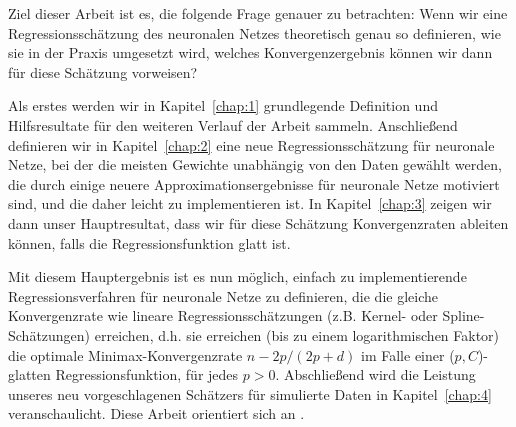 Ziel dieser Arbeit ist es, die folgende Frage genauer zu betrachten: Wenn wir eine Regressionsschätzung des neuronalen Netzes theoretisch genau so definieren, wie sie in der Praxis umgesetzt wird, welches Konvergenzergebnis können wir dann für diese Schätzung vorweisen? 

Als erstes werden wir in Kapitel~\ref{chap:1} grundlegende Definition und Hilfsresultate für den weiteren Verlauf der Arbeit sammeln.
Anschließend definieren wir in Kapitel~\ref{chap:2} eine neue Regressionsschätzung für neuronale Netze, bei der die meisten Gewichte unabhängig von den Daten gewählt werden, die durch einige neuere Approximationsergebnisse für neuronale Netze motiviert sind, und die daher leicht zu implementieren ist. In Kapitel~\ref{chap:3} zeigen wir dann unser Hauptresultat, dass wir für diese Schätzung Konvergenzraten ableiten können, falls die Regressionsfunktion glatt ist. 

Mit diesem Hauptergebnis ist es nun möglich, einfach zu implementierende Regressionsverfahren für neuronale Netze zu definieren, die die gleiche Konvergenzrate wie lineare Regressionsschätzungen (z.B. Kernel- oder Spline-Schätzungen) erreichen, d.h. sie erreichen (bis zu einem logarithmischen Faktor) die optimale Minimax-Konvergenzrate $n-2p/(2p+d)$ im Falle einer ($p,C$)-glatten Regressionsfunktion, für jedes $p > 0$.
Abschließend wird die Leistung unseres neu vorgeschlagenen Schätzers für simulierte Daten in Kapitel~\ref{chap:4} veranschaulicht. Diese Arbeit orientiert sich an \cite{kohler19}.

